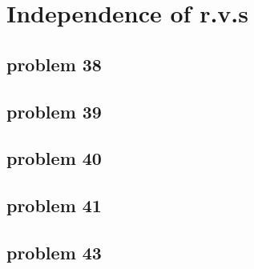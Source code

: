 \section{Independence of r.v.s}

\subsection{problem 38}


\subsection{problem 39}


\subsection{problem 40}


\subsection{problem 41}


\subsection{problem 43}

